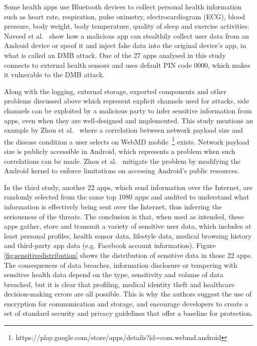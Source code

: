 Some health apps use Bluetooth devices to collect personal health information such as heart rate, respiration, pulse oximetry, electrocardiogram (ECG), blood pressure, body weight, body temperature, quality of sleep and exercise activities. Naveed et al.~\cite{naveed2014inside} show how a malicious app can stealthily collect user data from an Android device or spoof it and inject fake data into the original device's app, in what is called an \ac{DMB} attack. One of the 27 apps analysed in this study connects to external health sensors and uses default PIN code 0000, which makes it vulnerable to the \ac{DMB} attack.

Along with the logging, external storage, exported components and other problems discussed above which represent explicit channels used for attacks, side channels can be exploited by a malicious party to infer sensitive information from apps, even when they are well-designed and implemented. This study mentions an example by Zhou et al.~\cite{zhou2013identity} where a correlation between network payload size and the disease condition a user selects on WebMD mobile~\footnote{https://play.google.com/store/apps/details?id=com.webmd.android} exists. Network payload size is publicly accessible in Android, which represents a problem when such correlations can be made. Zhou et al.~\cite{zhou2013identity} mitigate the problem by modifying the Android kernel to enforce limitations on accessing Android's public resources. 

In the third study, another 22 apps, which send information over the Internet, are randomly selected from the same top 1080 apps and audited to understand what information is effectively being sent over the Internet, thus inferring the seriousness of the threats. The conclusion is that, when used as intended, these apps gather, store and transmit a variety of sensitive user data, which includes at least personal profiles, health sensor data, lifestyle data, medical browsing history and third-party app data (e.g. Facebook account information). Figure \ref{fig:sensitivedistribution} shows the distribution of sensitive data in those 22 apps. The consequences of data breaches, information disclosure or tempering with sensitive health data depend on the type, sensitivity and volume of data breached, but it is clear that profiling, medical identity theft and healthcare decision-making errors are all possible. This is why the authors suggest the use of encryption for communication and storage, and encourage developers to create a set of standard security and privacy guidelines that offer a baseline for protection.\\

